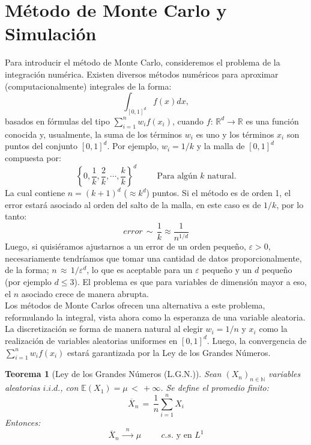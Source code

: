 \documentclass[a4paper]{article}
\newtheorem{teorema}{Teorema}
\numberwithin{equation}{subsection}
\def\R{\mathbb R}
\def\N{\mathbb N}
\def\E{\mathbb E}
\begin{document}
\section{Método de Monte Carlo y Simulación}
Para introducir el método de Monte Carlo, consideremos el problema de la integración numérica. Existen diversos métodos numéricos para aproximar (computacionalmente) integrales de la forma:
\[\int_{[0,1]^d}f(x)dx,\]
basados en fórmulas del tipo $\sum_{i=1}^n w_if(x_i)$, cuando $f:\,\R^d\rightarrow\R$ es una función conocida y, usualmente, la suma de los términos $w_i$ es uno y los términos $x_i$ son puntos del conjunto $[0,1]^d$. Por ejemplo, $w_i = 1/k$ y la malla de $[0,1]^d$ compuesta por:
\[\left\{0,\frac{1}{k},\frac{2}{k},\cdots,\frac{k}{k}\right\}^d\hspace{1cm}\text{Para algún $k$ natural.}\]
La cual contiene $n = (k+1)^d$ ($\approx k^d $) puntos. Si el método es de orden 1, el error estará asociado al orden del salto de la malla, en este caso es de $1/k$, por lo tanto:
\[error\,\sim\,\frac{1}{k}\approx \frac{1}{n^{1/d}}\]
Luego, si quisiéramos ajustarnos a un error de un orden pequeño, $\varepsilon > 0$, necesariamente tendríamos que tomar una cantidad de datos proporcionalmente, de la forma; $n\,\approx\,1/\varepsilon^d$, lo que es aceptable para un $\varepsilon$ pequeño y un $d$ pequeño (por ejemplo $d\leq 3$). El problema es que para variables de dimensión mayor a eso, el $n$ asociado crece de manera abrupta. \\Los métodos de Monte Carlos ofrecen una alternativa a este problema, reformulando la integral, vista ahora como la esperanza de una variable aleatoria. La discretización se forma de manera natural al elegir $w_i = 1/n$ y $x_i$ como la realización de variables aleatorias uniformes en $[0,1]^d$. Luego, la convergencia de $\sum_{i=1}^n w_if(x_i)$ estará garantizada por la Ley de los Grandes Números.

\begin{teorema}[Ley de los Grandes Números (L.G.N.)] Sean $(X_n)_{n\in\N}$ variables aleatorias $i.i.d.$, con $\E(X_1)=\mu\,<\,+\infty$. Se define el promedio finito:
\[\overline{X}_n\,=\,\frac{1}{n}\sum_{i=1}^nX_i\]
Entonces:
\[\overline{X}_n\,\xrightarrow{\,\,\,n\,\,\,}\,\mu\hspace{1cm}c.s.\text{ y en }L^1\]
\end{teorema}
\end{document}
